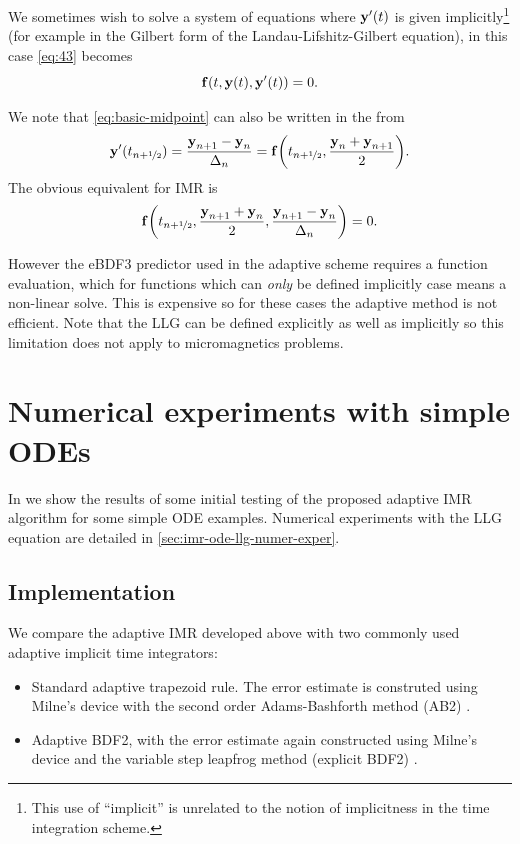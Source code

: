 We sometimes wish to solve a system of equations where $\boldsymbol{\mathrm{y}}'(t)$ is given implicitly\footnote{This use of ``implicit'' is unrelated to the notion of implicitness in the time integration scheme.} (for example in the Gilbert form of the Landau-Lifshitz-Gilbert equation), in this case \cref{eq:43} becomes
\begin{equation}
  {\boldsymbol{\mathrm{f}}{\left( t, \boldsymbol{\mathrm{y}}(t), \boldsymbol{\mathrm{y}}'(t) \right)}} = 0.
\end{equation}

We note that \cref{eq:basic-midpoint} can also be written in the from
\begin{equation}
  \boldsymbol{\mathrm{y}}'(t_{n+\nicefrac{1}{2}}) = \frac{\boldsymbol{\mathrm{y}}_{n+1} - \boldsymbol{\mathrm{y}}_n}{\Delta_{n}} =  {\boldsymbol{\mathrm{f}}{\left( t_{n+\nicefrac{1}{2}}, \frac{\boldsymbol{\mathrm{y}}_n + \boldsymbol{\mathrm{y}}_{n+1}}{2} \right)}}.
\end{equation}
The obvious equivalent for IMR is
\begin{equation}
  {\boldsymbol{\mathrm{f}}{\left( t_{n+\nicefrac{1}{2}}, \frac{\boldsymbol{\mathrm{y}}_{n+1} + \boldsymbol{\mathrm{y}}_n}{2}, \frac{\boldsymbol{\mathrm{y}}_{n+1} - \boldsymbol{\mathrm{y}}_n}{\Delta_{n}} \right)}} = 0.
\end{equation}

However the eBDF3 predictor used in the adaptive scheme requires a function evaluation, which for functions which can \emph{only} be defined implicitly case means a non-linear solve.
This is expensive so for these cases the adaptive method is not efficient.
Note that the LLG can be defined explicitly as well as implicitly so this limitation does not apply to micromagnetics problems.


\section{Numerical experiments with simple ODEs}
\label{sec:aimr-testing}



In  we show the results of some initial testing of the proposed adaptive IMR algorithm for some simple ODE examples.
Numerical experiments with the LLG equation are detailed in \cref{sec:imr-ode-llg-numer-exper}.


\subsection{Implementation}
\label{sec:aimr-implementation}

We compare the adaptive IMR developed above with two commonly used adaptive implicit time integrators:
\begin{itemize}
\item Standard adaptive trapezoid rule.
  The error estimate is construted using Milne's device with the second order Adams-Bashforth method (AB2) \cite[707]{GreshoSani}.
\item Adaptive BDF2, with the error estimate again constructed using Milne's device and the variable step leapfrog method (\ie explicit BDF2) \cite[715]{GreshoSani}.
\end{itemize}

